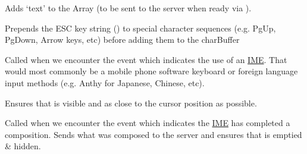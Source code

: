 \documentclass[letterpaper,10pt,openany]{sphinxmanual}
\begin{document}
\begin{fulllineitems}
\begin{fulllineitems}
\end{fulllineitems}



\begin{fulllineitems}
\label{Applications/terminal/js_terminal_input:GateOne.Terminal.Input.queue}
Adds `text' to the  Array (to be sent to the server when ready via ).

\end{fulllineitems}



\begin{fulllineitems}
Prepends the ESC key string () to special character sequences (e.g. PgUp, PgDown, Arrow keys, etc) before adding them to the charBuffer

\end{fulllineitems}



\begin{fulllineitems}
\label{Applications/terminal/js_terminal_input:GateOne.Terminal.Input.onCompositionStart}
Called when we encounter the  event which indicates the use of an \href{http://en.wikipedia.org/wiki/Input\_method}{IME}.  That would most commonly be a mobile phone software keyboard or foreign language input methods (e.g. Anthy for Japanese, Chinese, etc).

Ensures that  is visible and as close to the cursor position as possible.

\end{fulllineitems}



\begin{fulllineitems}
\label{Applications/terminal/js_terminal_input:GateOne.Terminal.Input.onCompositionEnd}
Called when we encounter the  event which indicates the \href{http://en.wikipedia.org/wiki/Input\_method}{IME} has completed a composition.  Sends what was composed to the server and ensures that  is emptied \& hidden.


\end{fulllineitems}
\end{fulllineitems}
\end{document}
